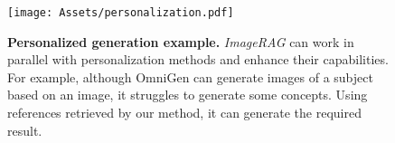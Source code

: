 \vspace{-2pt}
\begin{figure}[htp]
  \centering
   \texttt{[image: Assets/personalization.pdf]}
   \caption{\textbf{Personalized generation example.}
   \emph{ImageRAG} can work in parallel with personalization methods and enhance their capabilities. For example, although OmniGen can generate images of a subject based on an image, it struggles to generate some concepts. Using references retrieved by our method, it can generate the required result.
}
   \label{fig:personalization}\vspace{-10pt}
\end{figure}